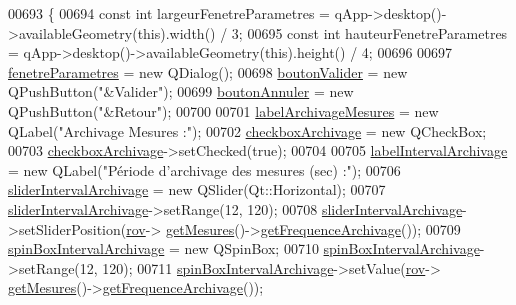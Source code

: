 \begin{DoxyCode}
00693 \{
00694     \textcolor{keyword}{const} \textcolor{keywordtype}{int} largeurFenetreParametres = qApp->desktop()->availableGeometry(\textcolor{keyword}{this}).width() / 3;
00695     \textcolor{keyword}{const} \textcolor{keywordtype}{int} hauteurFenetreParametres = qApp->desktop()->availableGeometry(\textcolor{keyword}{this}).height() / 4;
00696 
00697     \hyperlink{class_i_h_m_rov_a277956dfb79e5345e5ae0117fe41ddf2}{fenetreParametres} = \textcolor{keyword}{new} QDialog();
00698     \hyperlink{class_i_h_m_rov_a4294b6c808089083906fb0815d1c9c27}{boutonValider} = \textcolor{keyword}{new} QPushButton(\textcolor{stringliteral}{"&Valider"});
00699     \hyperlink{class_i_h_m_rov_a4a6fec1b4a86c93c1d0d62d66804db5c}{boutonAnnuler} = \textcolor{keyword}{new} QPushButton(\textcolor{stringliteral}{"&Retour"});
00700 
00701     \hyperlink{class_i_h_m_rov_a58e157352986f690bca4b79b9b05ee1d}{labelArchivageMesures} = \textcolor{keyword}{new} QLabel(\textcolor{stringliteral}{"Archivage Mesures :"});
00702     \hyperlink{class_i_h_m_rov_a85be76b5fee7281642db582a79a53511}{checkboxArchivage} = \textcolor{keyword}{new} QCheckBox;
00703     \hyperlink{class_i_h_m_rov_a85be76b5fee7281642db582a79a53511}{checkboxArchivage}->setChecked(\textcolor{keyword}{true});
00704 
00705     \hyperlink{class_i_h_m_rov_a42fb93c9764bfc2fe81ba65fc02d8de2}{labelIntervalArchivage} = \textcolor{keyword}{new} QLabel(\textcolor{stringliteral}{"Période d'archivage des mesures (sec) :"});
00706     \hyperlink{class_i_h_m_rov_a8c55c93ee14ee51335e72af07b521312}{sliderIntervalArchivage} = \textcolor{keyword}{new} QSlider(Qt::Horizontal);
00707     \hyperlink{class_i_h_m_rov_a8c55c93ee14ee51335e72af07b521312}{sliderIntervalArchivage}->setRange(12, 120);
00708     \hyperlink{class_i_h_m_rov_a8c55c93ee14ee51335e72af07b521312}{sliderIntervalArchivage}->setSliderPosition(\hyperlink{class_i_h_m_rov_a777ca33fdb295ba6b6773e880356fa1e}{rov}->
      \hyperlink{class_rov_a0edd5f7db785bd856b8723fe49ca7848}{getMesures}()->\hyperlink{class_mesures_ae969e38402b8d19fe9b484f368200578}{getFrequenceArchivage}());
00709     \hyperlink{class_i_h_m_rov_abc906e8e992ecdf5eb1dae5dc622b768}{spinBoxIntervalArchivage} = \textcolor{keyword}{new} QSpinBox;
00710     \hyperlink{class_i_h_m_rov_abc906e8e992ecdf5eb1dae5dc622b768}{spinBoxIntervalArchivage}->setRange(12, 120);
00711     \hyperlink{class_i_h_m_rov_abc906e8e992ecdf5eb1dae5dc622b768}{spinBoxIntervalArchivage}->setValue(\hyperlink{class_i_h_m_rov_a777ca33fdb295ba6b6773e880356fa1e}{rov}->
      \hyperlink{class_rov_a0edd5f7db785bd856b8723fe49ca7848}{getMesures}()->\hyperlink{class_mesures_ae969e38402b8d19fe9b484f368200578}{getFrequenceArchivage}());

\end{DoxyCode}
